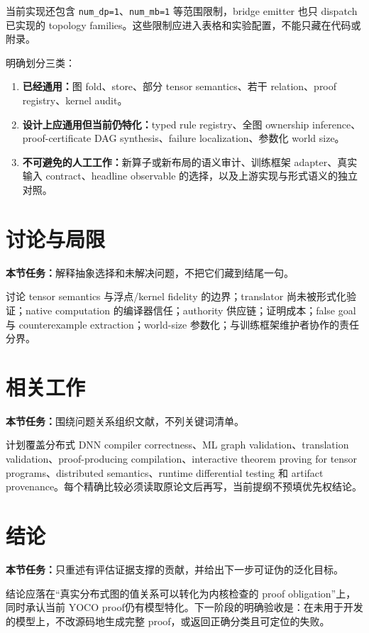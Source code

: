 \documentclass[11pt,a4paper]{ctexart}
\newcommand{\contract}[1]{\par\smallskip\noindent\colorbox{light}{\parbox{0.95\linewidth}{\textbf{本节任务：}#1}}\par\smallskip}
\begin{document}
当前实现还包含 \texttt{num\_dp=1}、\texttt{num\_mb=1} 等范围限制，bridge emitter 也只 dispatch 已实现的 topology families。这些限制应进入表格和实验配置，不能只藏在代码或附录。

明确划分三类：
\begin{enumerate}
  \item \textbf{已经通用：}图 fold、store、部分 tensor semantics、若干 relation、proof registry、kernel audit。
  \item \textbf{设计上应通用但当前仍特化：}typed rule registry、全图 ownership inference、proof-certificate DAG synthesis、failure localization、参数化 world size。
  \item \textbf{不可避免的人工工作：}新算子或新布局的语义审计、训练框架 adapter、真实输入 contract、headline observable 的选择，以及上游实现与形式语义的独立对照。
\end{enumerate}

\section{讨论与局限}
\contract{解释抽象选择和未解决问题，不把它们藏到结尾一句。}

讨论 tensor semantics 与浮点/kernel fidelity 的边界；translator 尚未被形式化验证；native computation 的编译器信任；authority 供应链；证明成本；false goal 与 counterexample extraction；world-size 参数化；与训练框架维护者协作的责任分界。

\section{相关工作}
\contract{围绕问题关系组织文献，不列关键词清单。}

计划覆盖分布式 DNN compiler correctness、ML graph validation、translation validation、proof-producing compilation、interactive theorem proving for tensor programs、distributed semantics、runtime differential testing 和 artifact provenance。每个精确比较必须读取原论文后再写，当前提纲不预填优先权结论。

\section{结论}
\contract{只重述有评估证据支撑的贡献，并给出下一步可证伪的泛化目标。}

结论应落在“真实分布式图的值关系可以转化为内核检查的 proof obligation”上，同时承认当前 YOCO proof仍有模型特化。下一阶段的明确验收是：在未用于开发的模型上，不改源码地生成完整 proof，或返回正确分类且可定位的失败。
\end{document}
